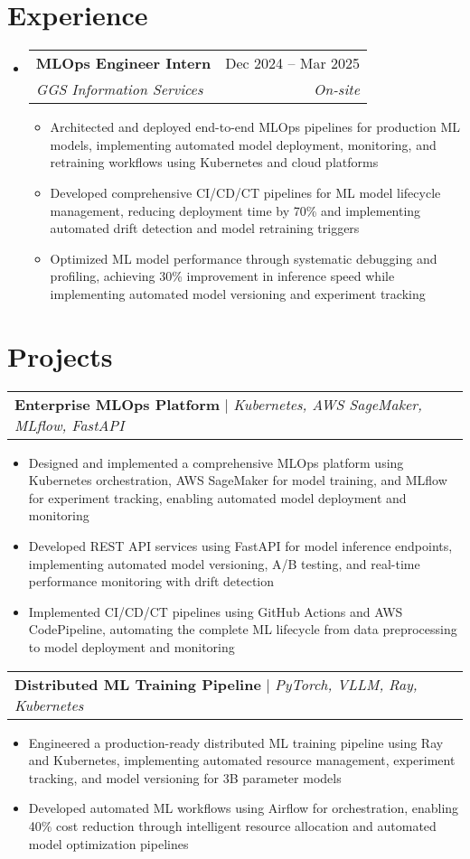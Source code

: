 \documentclass[letterpaper,11pt]{article}
\makeatletter
\newcommand{\resumeItem}[1]{
  \item\small{
    {#1 \vspace{-2pt}}
  }
}
\newcommand{\resumeSubheading}[4]{
  \vspace{-2pt}\item
    \begin{tabular*}{0.97\textwidth}[t]{l@{\extracolsep{\fill}}r}
      \textbf{#1} & #2 \\
      \textit{\small#3} & \textit{\small #4} \\
    \end{tabular*}\vspace{-7pt}
}
\newcommand{\resumeProjectHeading}[2]{
    \item
    \begin{tabular*}{0.97\textwidth}{l@{\extracolsep{\fill}}r}
      \small#1 & #2 \\
    \end{tabular*}\vspace{-7pt}
}
\newcommand{\resumeSubHeadingListStart}{\begin{itemize}[leftmargin=0.15in, label={}]}
\newcommand{\resumeSubHeadingListEnd}{\end{itemize}}
\newcommand{\resumeItemListStart}{\begin{itemize}}
\newcommand{\resumeItemListEnd}{\end{itemize}\vspace{-5pt}}
\makeatother
\begin{document}
\section{Experience}
  \resumeSubHeadingListStart
    \resumeSubheading  
      {MLOps Engineer Intern}{Dec 2024 -- Mar 2025}  
      {GGS Information Services}{On-site} 
      \resumeItemListStart  
        \resumeItem{Architected and deployed end-to-end MLOps pipelines for production ML models, implementing automated model deployment, monitoring, and retraining workflows using Kubernetes and cloud platforms}
        \resumeItem{Developed comprehensive CI/CD/CT pipelines for ML model lifecycle management, reducing deployment time by 70\% and implementing automated drift detection and model retraining triggers}
        \resumeItem{Optimized ML model performance through systematic debugging and profiling, achieving 30\% improvement in inference speed while implementing automated model versioning and experiment tracking}
      \resumeItemListEnd 
  \resumeSubHeadingListEnd

\section{Projects}
\resumeProjectHeading
{\textbf{Enterprise MLOps Platform} $|$ \emph{Kubernetes, AWS SageMaker, MLflow, FastAPI}}{}
  \resumeItemListStart
    \resumeItem{Designed and implemented a comprehensive MLOps platform using Kubernetes orchestration, AWS SageMaker for model training, and MLflow for experiment tracking, enabling automated model deployment and monitoring}
    \resumeItem{Developed REST API services using FastAPI for model inference endpoints, implementing automated model versioning, A/B testing, and real-time performance monitoring with drift detection}
    \resumeItem{Implemented CI/CD/CT pipelines using GitHub Actions and AWS CodePipeline, automating the complete ML lifecycle from data preprocessing to model deployment and monitoring}
  \resumeItemListEnd

\resumeProjectHeading
{\textbf{Distributed ML Training Pipeline} $|$ \emph{PyTorch, VLLM, Ray, Kubernetes}}{}
  \resumeItemListStart
    \resumeItem{Engineered a production-ready distributed ML training pipeline using Ray and Kubernetes, implementing automated resource management, experiment tracking, and model versioning for 3B parameter models}
    \resumeItem{Developed automated ML workflows using Airflow for orchestration, enabling 40\% cost reduction through intelligent resource allocation and automated model optimization pipelines}
  \resumeItemListEnd
\end{document}
